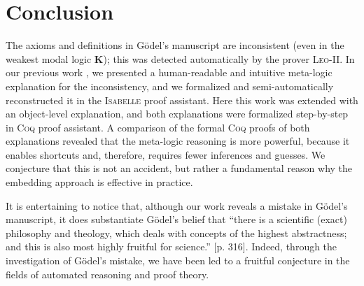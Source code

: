 \documentclass{llncs}
\newcommand{\logic}[1]{\textbf{#1}\xspace}
\newcommand{\K}{\logic{K}}
\begin{document}
\section{Conclusion}\label{sec:conclusion}


The axioms and definitions in G\"odel's manuscript are inconsistent (even in the weakest modal logic \K);
this was detected automatically by the prover
\textsc{Leo-II}. In our previous work \cite{C55}, we presented a human-readable and intuitive meta-logic explanation for the inconsistency, and we formalized and semi-automatically reconstructed it in the \textsc{Isabelle} proof assistant. Here this work was extended with an object-level explanation, and both explanations were formalized step-by-step in \textsc{Coq} proof assistant. A comparison of the formal \textsc{Coq} proofs of both explanations revealed that the meta-logic reasoning is more powerful, because it enables shortcuts and, therefore, requires fewer inferences and guesses. We conjecture that this is not an accident, but rather a fundamental reason why the embedding approach is effective in practice. 

It is entertaining to notice that, although our work reveals a mistake in G\"odel's manuscript, it does substantiate G\"odel's belief that 
``there is a scientific (exact) philosophy and theology,
which deals with concepts of the highest abstractness; 
and this is also most highly fruitful for science.'' \cite{Wang1996}[p. 316]. Indeed, through the investigation of G\"odel's mistake, we have been led to a fruitful conjecture in the fields of automated reasoning and proof theory.




\end{document}
